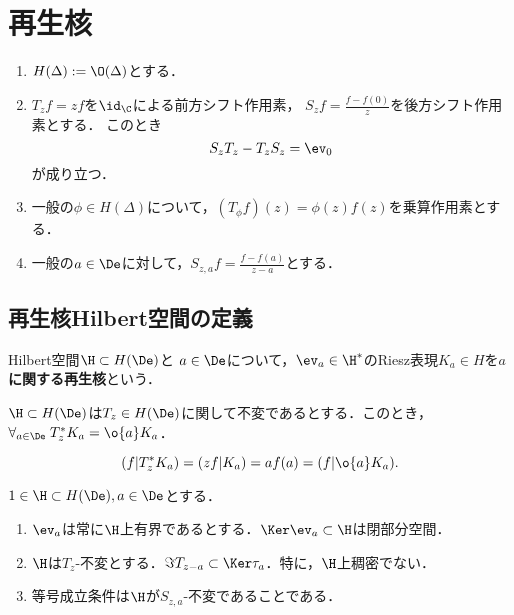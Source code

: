 \documentclass[uplatex,dvipdfmx]{jsreport}
\begin{document}
\section{再生核}

\begin{notation}\mbox{}
    \begin{enumerate}
        \item $H(\Delta):=\O(\Delta)$とする．
        \item $T_zf=zf$を$\id_\C$による前方シフト作用素，
        $S_zf=\frac{f-f(0)}{z}$を後方シフト作用素とする．
        このとき
        \[S_zT_z-T_zS_z=\ev_0\]
        が成り立つ．
        \item 一般の$\phi\in H(\Delta)$について，$(T_\phi f)(z)=\phi(z)f(z)$を乗算作用素とする．
        \item 一般の$a\in\De$に対して，$S_{z,a}f=\frac{f-f(a)}{z-a}$とする．
    \end{enumerate}
\end{notation}

\subsection{再生核Hilbert空間の定義}

\begin{definition}
    Hilbert空間$\H\subset H(\De)$と
    $a\in\De$について，$\ev_a\in\H^*$のRiesz表現$K_a\in H$を\textbf{$a$に関する再生核}という．
\end{definition}

\begin{lemma}
    $\H\subset H(\De)$は$T_z\in H(\De)$に関して不変であるとする．このとき，$\forall_{a\in\De}\;T^*_zK_a=\o{a}K_a$．
\end{lemma}
\begin{Proof}
    \[(f|T^*_zK_a)=(zf|K_a)=af(a)=(f|\o{a}K_a).\]
\end{Proof}

\begin{proposition}
    $1\in\H\subset H(\De),a\in\De$とする．
    \begin{enumerate}
        \item $\ev_a$は常に$\H$上有界であるとする．$\Ker\ev_a\subset\H$は閉部分空間．
        \item $\H$は$T_z$-不変とする．$\Im T_{z-a}\subset\Ker\tau_a$．特に，$\H$上稠密でない．
        \item 等号成立条件は$\H$が$S_{z,a}$-不変であることである．
    \end{enumerate}
\end{proposition}
\end{document}

